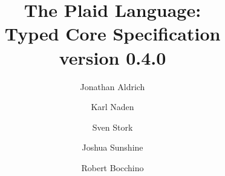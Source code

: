 \documentclass[12pt]{article}
\title{The Plaid Language:\\
Typed Core Specification\\
\vspace{2ex}
version 0.4.0\\
\vspace{2ex}
}
\author{Jonathan Aldrich \and Karl Naden \and Sven Stork \and Joshua Sunshine \and Robert Bocchino}
\date{\monthname~\the \year}
\begin{document}
\renewcommand*{\thepage}{title-\arabic{page}} 
\maketitle
\renewcommand*{\thepage}{\arabic{page}} 

















\end{document}
